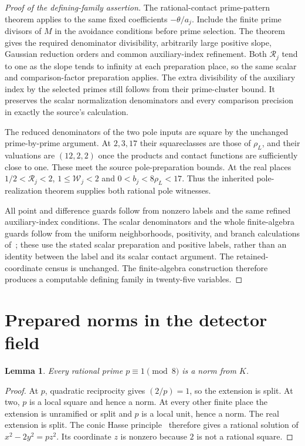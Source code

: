\documentclass[11pt,a4paper]{article}
\newtheorem{lemma}[theorem]{Lemma}
\begin{document}
\begin{proof}[Proof of the defining-family assertion]
The rational-contact prime-pattern theorem applies to the same fixed
coefficients $-\theta/a_j$. Include the finite prime divisors of $M$
in the avoidance conditions before prime selection. The theorem gives
the required denominator divisibility, arbitrarily large positive
slope, Gaussian reduction orders and common auxiliary-index refinement.
Both $\mathcal R_j$ tend to one as the slope tends to infinity at
each preparation place, so the same scalar and comparison-factor
preparation applies. The extra divisibility of the auxiliary index by
the selected primes still follows from their prime-cluster bound.
It preserves the scalar normalization denominators and every
comparison precision in exactly the source's calculation.

The reduced denominators of the two pole inputs are square by the
unchanged prime-by-prime argument. At $2,3,17$ their squareclasses are
those of $\rho_L$, and their valuations are $(12,2,2)$ once the
products and contact functions are sufficiently close to one.
These meet the source pole-preparation bounds. At the real places
$1/2<\mathcal R_j<2$, $1\le\mathcal W_j<2$ and
$0<b_j<8\rho_L<17$. Thus the inherited pole-realization theorem
supplies both rational pole witnesses.

All point and difference guards follow from nonzero labels and the
same refined auxiliary-index conditions. The scalar denominators and
the whole finite-algebra guards follow from the uniform neighborhoods,
positivity, and branch calculations of~\cite{UnitNorm}; these use
the stated scalar preparation and positive labels, rather than an
identity between the label and its scalar contact argument. The
retained-coordinate census is unchanged. The finite-algebra
construction therefore produces a computable defining family in
twenty-five variables.
\end{proof}

\section{Prepared norms in the detector field}
\begin{lemma}\label{lem:prime}
Every rational prime $p\equiv1\pmod8$ is a norm from $K$.
\end{lemma}
\begin{proof}
At $p$, quadratic reciprocity gives $(2/p)=1$, so the extension
is split. At two, $p$ is a local square and hence a norm. At every
other finite place the extension is unramified or split and $p$ is
a local unit, hence a norm. The real extension is split. The conic
Hasse principle~\cite[Theorem~26.1 and Corollary~26.5]{Poonen}
therefore gives a rational solution of $x^2-2y^2=pz^2$.
Its coordinate $z$ is nonzero because $2$ is not a rational square.
\end{proof}
\end{document}
